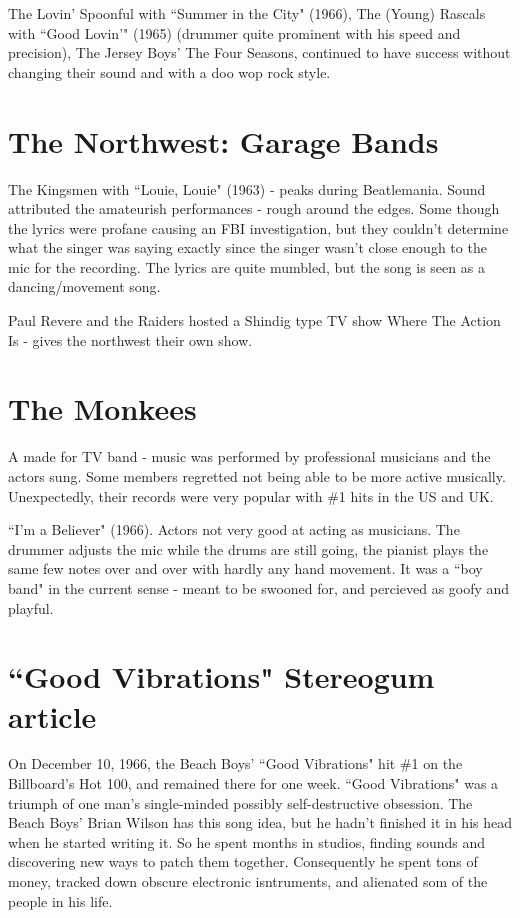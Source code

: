 \documentclass[12pt, a4paper, twoside, openright, titlepage]{book}
\begin{document}
The Lovin' Spoonful with ``Summer in the City" (1966), The (Young) Rascals with ``Good Lovin'" (1965) (drummer quite prominent with his speed and precision), The Jersey Boys' The Four Seasons, continued to have success without changing their sound and with a doo wop rock style.


\section{The Northwest: Garage Bands}

The Kingsmen with ``Louie, Louie" (1963) - peaks during Beatlemania. Sound attributed the amateurish performances - rough around the edges. Some though the lyrics were profane causing an FBI investigation, but they couldn't determine what the singer was saying exactly since the singer wasn't close enough to the mic for the recording. The lyrics are quite mumbled, but the song is seen as a dancing/movement song.

Paul Revere and the Raiders hosted a Shindig type TV show Where The Action Is - gives the northwest their own show.



\section{The Monkees}

A made for TV band - music was performed by professional musicians and the actors sung. Some members regretted not being able to be more active musically. Unexpectedly, their records were very popular with \#1 hits in the US and UK. 

\begin{eg}{}{}
    ``I'm a Believer" (1966). Actors not very good at acting as musicians. The drummer adjusts the mic while the drums are still going, the pianist plays the same few notes over and over with hardly any hand movement. It was a ``boy band" in the current sense - meant to be swooned for, and percieved as goofy and playful.
\end{eg}








\section{``Good Vibrations" Stereogum article}

On December 10, 1966, the Beach Boys' ``Good Vibrations" hit \#1 on the Billboard's Hot 100, and remained there for one week. ``Good Vibrations" was a triumph of one man's single-minded possibly self-destructive obsession. The Beach Boys' Brian Wilson has this song idea, but he hadn't finished it in his head when he started writing it. So he spent months in studios, finding sounds and discovering new ways to patch them together. Consequently he spent tons of money, tracked down obscure electronic isntruments, and alienated som of the people in his life.
\end{document}
